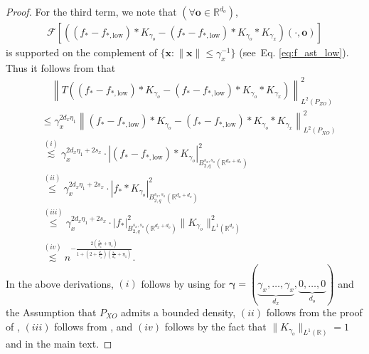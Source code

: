 \documentclass[11pt]{article}
\newcommand{\bgamma}{\boldsymbol{\gamma}}
\newcommand{\bx}{\mathbf x}
\newcommand{\bo}{\mathbf o}
\newcommand{\calF}{\mathcal{F}}
\newcommand{\0}{\mathbf{0}}
\begin{document}
\begin{appendix}
\begin{proof}
\noindent
For the third term, we note that $(\forall \bo\in \mathbb{R}^{d_o})$, 
\begin{align*}
    \calF[\left((f_{\ast} - f_{\ast , \mathrm{low}}) \ast K_{\gamma_o} - (f_{\ast} - f_{\ast, \mathrm{low}}) \ast K_{\gamma_o} \ast K_{\gamma_x}\right)(\cdot, \bo)] 
\end{align*}
is supported on the complement of $\{\bx: \|\bx\| \leq \gamma_x^{-1}\}$ (see~Eq. \eqref{eq:f_ast_low}). Thus it follows from  that
\begin{align*}
    &\quad \left\| T\left((f_{\ast} - f_{\ast , \mathrm{low}}) \ast K_{\gamma_o} - (f_{\ast} - f_{\ast, \mathrm{low}}) \ast K_{\gamma_o} \ast K_{\gamma_x}\right) \right\|_{L^2(P_{ZO})}^2 \\
    &\leq \gamma_x^{2d_x\eta_1}\left\| (f_{\ast} - f_{\ast , \mathrm{low}}) \ast K_{\gamma_o} - (f_{\ast} - f_{\ast, \mathrm{low}}) \ast K_{\gamma_o} \ast K_{\gamma_x} \right\|_{L^2(P_{XO})}^2\\
    &\stackrel{(i)}{\lesssim} \gamma_x^{2d_x\eta_1+ 2s_x}\cdot \left|(f_{\ast} - f_{\ast , \mathrm{low}}) \ast K_{\gamma_o}\right|^2_{B^{s_x,s_o}_{2,q}(\mathbb{R}^{d_x+d_o})}\\
    &\stackrel{(ii)}{\leq} \gamma_x^{2d_x\eta_1+ 2s_x}\cdot \left|f_{\ast} \ast K_{\gamma_o}\right|^2_{B^{s_x,s_o}_{2,q}(\mathbb{R}^{d_x+d_o})}\\
    &\stackrel{(iii)}{\leq} \gamma_x^{2d_x\eta_1+ 2s_x}\cdot \left|f_{\ast}\right|^2_{B^{s_x,s_o}_{2,q}(\mathbb{R}^{d_x+d_o})} \|K_{\gamma_o}\|^2_{L^1(\mathbb{R}^{d_o})}\\
    &\stackrel{(iv)}{\lesssim} n^{-\frac{2(\frac{s_x}{d_x}+\eta_1)}{1+(2+\frac{d_o}{s_o})(\frac{s_x}{d_x}+\eta_1)}}. 
\end{align*}
In the above derivations, $(i)$ follows by using  for $\bgamma = (\underbrace{\gamma_x,\dots,\gamma_x}_{d_x},\underbrace{0,\dots,0}_{d_o})$ and the Assumption that $P_{XO}$ admits a bounded density, $(ii)$ follows from the proof of , $(iii)$ follows from , and $(iv)$ follows by the fact that $\|K_{\gamma_o}\|_{L^1(\mathbb{R})}= 1$ \citep[Section 4.1.2]{Giné_Nickl_2015} and  in the main text.


\end{proof}
\end{appendix}
\end{document}
